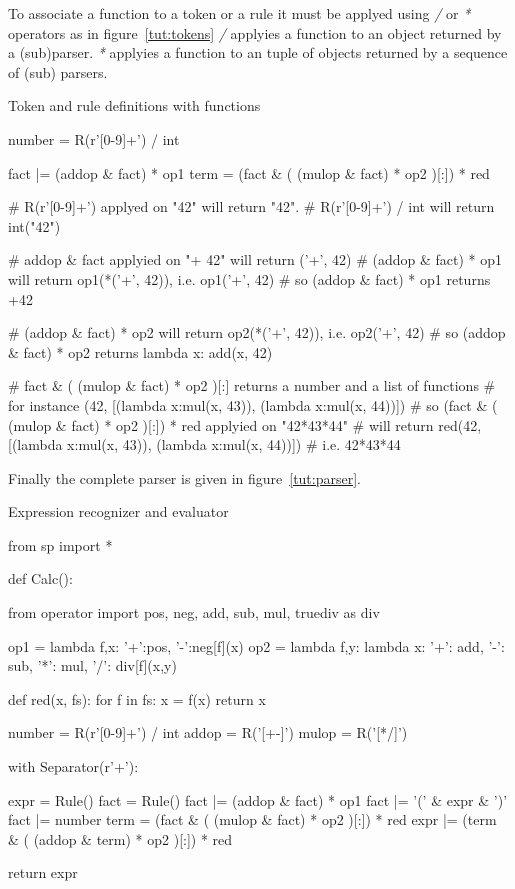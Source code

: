 To associate a function to a token or a rule it must be applyed using \emph{/} or \emph{*} operators as in figure~\ref{tut:tokens}
\emph{/} applyies a function to an object returned by a (sub)parser.
\emph{*} applyies a function to an tuple of objects returned by a sequence of (sub) parsers.

\begin{code}
\caption{Token and rule definitions with functions}                  \label{tut:tokens}
\begin{verbatimtab}[4]
    number = R(r'[0-9]+') / int

    fact |= (addop & fact) * op1
    term = (fact & ( (mulop & fact) * op2 )[:]) * red

    # R(r'[0-9]+') applyed on "42" will return "42".
    # R(r'[0-9]+') / int will return int("42")

    # addop & fact applyied on "+ 42" will return ('+', 42)
    # (addop & fact) * op1 will return op1(*('+', 42)), i.e. op1('+', 42)
    # so (addop & fact) * op1 returns +42

    # (addop & fact) * op2 will return op2(*('+', 42)), i.e. op2('+', 42)
    # so (addop & fact) * op2 returns lambda x: add(x, 42)

    # fact & ( (mulop & fact) * op2 )[:] returns a number and a list of functions
    # for instance (42, [(lambda x:mul(x, 43)), (lambda x:mul(x, 44))])
    # so (fact & ( (mulop & fact) * op2 )[:]) * red applyied on "42*43*44"
    # will return red(42, [(lambda x:mul(x, 43)), (lambda x:mul(x, 44))])
    # i.e. 42*43*44
\end{verbatimtab}
\end{code}

Finally the complete parser is given in figure~\ref{tut:parser}.

\begin{code}
\caption{Expression recognizer and evaluator}               \label{tut:parser}
\begin{verbatimtab}[4]
from sp import *

def Calc():

    from operator import pos, neg, add, sub, mul, truediv as div

    op1 = lambda f,x: {'+':pos, '-':neg}[f](x)
    op2 = lambda f,y: lambda x: {'+': add, '-': sub, '*': mul, '/': div}[f](x,y)

    def red(x, fs):
        for f in fs: x = f(x)
        return x

    number = R(r'[0-9]+') / int
    addop = R('[+-]')
    mulop = R('[*/]')

    with Separator(r'\s+'):

        expr = Rule()
        fact = Rule()
        fact |= (addop & fact) * op1
        fact |= '(' & expr & ')'
        fact |= number
        term = (fact & ( (mulop & fact) * op2 )[:]) * red
        expr |= (term & ( (addop & term) * op2 )[:]) * red

    return expr
\end{verbatimtab}
\end{code}

